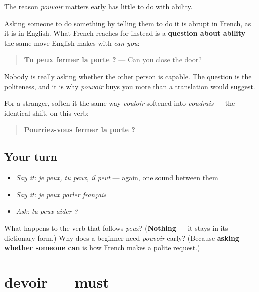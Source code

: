 \begin{culture}
The reason \emph{pouvoir} matters early has little to do with ability.

Asking someone to do something by telling them to do it is abrupt in French, as it is in English. What French reaches for instead is a \textbf{question about ability} — the same move English makes with \emph{can you}:

\begin{quote}
\textbf{Tu peux fermer la porte ?} — Can you close the door?
\end{quote}

Nobody is really asking whether the other person is capable. The question is the politeness, and it is why \emph{pouvoir} buys you more than a translation would suggest.

For a stranger, soften it the same way \emph{vouloir} softened into \emph{voudrais} — the identical shift, on this verb:

\begin{quote}
\textbf{Pourriez-vous fermer la porte ?}
\end{quote}
\end{culture}

\subsection*{Your turn}
\begin{itemize}
\raggedright
  \item \emph{Say it:} \emph{je peux, tu peux, il peut} — again, one sound between them
  \item \emph{Say it:} \emph{je peux parler français}
  \item \emph{Ask:} \emph{tu peux aider ?}
\end{itemize}

\begin{tcolorbox}[breakable,colback=teal!4,colframe=teal!35!black,title={Before you move on}]
What happens to the verb that follows \emph{peux}? (\textbf{Nothing} — it stays in its dictionary form.) Why does a beginner need \emph{pouvoir} early? (Because \textbf{asking whether someone can} is how French makes a polite request.)
\end{tcolorbox}
\section[devoir]{devoir — must}

\label{lesson:FR-C33-devoir}



